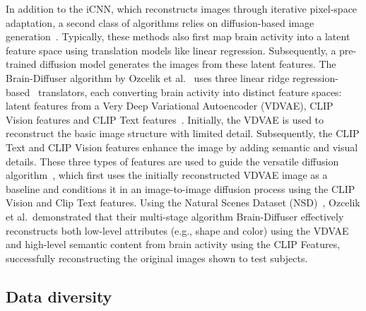 In addition to the iCNN, which reconstructs images through iterative pixel-space adaptation, a second class of algorithms relies on diffusion-based image generation~\cite{takagiHighResolutionImageReconstruction,ozcelikNaturalSceneReconstruction2023,scottiMindEye2SharedSubjectModels2024}. Typically, these methods also first map brain activity into a latent feature space using translation models like linear regression. Subsequently, a pre-trained diffusion model generates the images from these latent features. The Brain-Diffuser algorithm by Ozcelik et al.~\cite{ozcelikNaturalSceneReconstruction2023} uses three linear ridge regression-based~\cite{hoerlRidgeRegressionBiased1970} translators, each converting brain activity into distinct feature spaces: latent features from a Very Deep Variational Autoencoder (VDVAE)\cite{childVeryDeepVAEs2020},  CLIP Vision features and CLIP Text features~\cite{radfordLearningTransferableVisual2021}. Initially, the VDVAE is used to reconstruct the basic image structure with limited detail. Subsequently, the CLIP Text and CLIP Vision features enhance the image by adding semantic and visual details. These three types of features are used to guide the versatile diffusion algorithm~\cite{xuVersatileDiffusionText2024}, which first uses the initially reconstructed VDVAE image as a baseline and conditions it in an image-to-image diffusion process using the CLIP Vision and Clip Text features. Using the Natural Scenes Dataset (NSD)~\cite{allenMassive7TFMRI2022}, Ozcelik et al.\ demonstrated that their multi-stage algorithm Brain-Diffuser effectively reconstructs both low-level attributes (e.g., shape and color) using the VDVAE and high-level semantic content from brain activity using the CLIP Features, successfully reconstructing the original images shown to test subjects.




\subsection{Data diversity}


